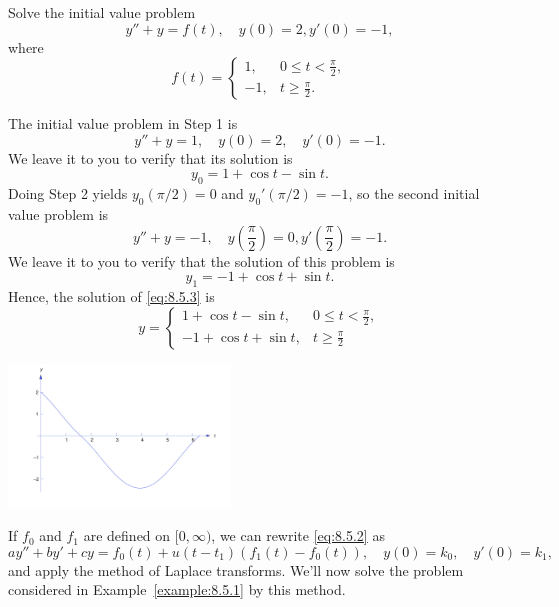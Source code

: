 \documentclass{ximera}
\begin{document}
\begin{example}\label{example:8.5.1}
Solve the initial value problem
\begin{equation}\label{eq:8.5.3}
y''+y=f(t),
\quad   y(0)=2,  y'(0)=-1,
\end{equation}
where
$$
f(t)=\left\{\begin{array}{rl}
1,&0\leq t<\frac{\pi}{2},\\
-1,&t\geq \frac{\pi}{2}.
\end{array}\right.
$$
\begin{explanation}
The initial value problem in Step 1 is
$$
y''+y=1, \quad   y(0)=2,\quad y'(0)=-1.
$$
We leave it to you to verify that its solution is
$$
y_0=1+\cos t-\sin t.
$$
Doing Step 2 yields
 $y_0(\pi/2)=0$ and $y_0'(\pi/2)=-1$,
so the second initial value problem is
$$
y''+y=-1, \quad  y\left(\frac{\pi}{2}\right)=0, y'\left(\frac{\pi}{2}\right)=-1.
$$
We leave it to you to verify that the solution of this problem
is
$$
y_1=-1+\cos t+\sin t.
$$
Hence, the solution of \eqref{eq:8.5.3} is
\begin{equation}\label{eq:8.5.4}
y=\left\{\begin{array}{rl}
1+\cos t-\sin t,&0\leq t<\frac{\pi}{2},
\\
-1+\cos t+\sin t,&t\geq \frac{\pi}{2}
\end{array}\right.
\end{equation}
\begin{image}
 \includegraphics[height=1.5in]{fig080501.jpg}
\end{image}

\end{explanation}
\end{example}

If $f_0$ and $f_1$ are defined on $[0,\infty)$, we can rewrite
\eqref{eq:8.5.2} as
$$
ay''+by'+cy=f_0(t)+u(t-t_1)\left(f_1(t)-f_0(t)\right), \quad  y(0)=k_0,\quad y'(0)=k_1,
$$
and apply the method of Laplace transforms. We'll now solve
the problem considered in Example~\ref{example:8.5.1} by this method.
\end{document}
